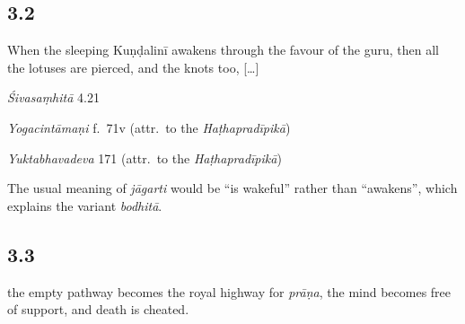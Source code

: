 \begin{ekdosis}
\subsection*{3.2}
\begin{translation}[hp03_002]
When the sleeping Kuṇḍalinī awakens through the favour of the guru, then all the lotuses are pierced, and the knots too, [\dots] 
\end{translation}

\begin{sources}[hp03_002]
\emph{Śivasaṃhitā} 4.21
\begin{versinnote}
\end{versinnote}
\end{sources}

\begin{testimonia}[hp03_002]
\emph{Yogacintāmaṇi} f.~71v (attr.~to the \emph{Haṭhapradīpikā})
\begin{versinnote}
\end{versinnote}

\emph{Yuktabhavadeva} 171 (attr.~to the \emph{Haṭhapradīpikā})
\begin{versinnote}
\end{versinnote}
\end{testimonia}

\begin{philcomm}[hp03_002]
The usual meaning of \emph{jāgarti} would be “is wakeful” rather than “awakens”, which explains the variant \emph{bodhitā}.
\end{philcomm}

\subsection*{3.3}
\begin{translation}[hp03_003]
[\dots] the empty pathway becomes the royal highway for \emph{prāṇa}, the mind becomes free of support, and death is cheated.
\end{translation}


\end{ekdosis}
